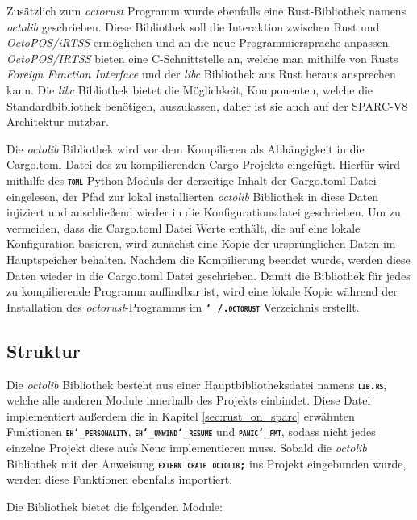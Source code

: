 Zusätzlich zum \textit{octorust} Programm wurde ebenfalls eine Rust-Bibliothek namens \textit{octolib} geschrieben. 
Diese Bibliothek soll die Interaktion zwischen Rust und \textit{OctoPOS/iRTSS} ermöglichen und an die neue 
Programmiersprache anpassen. \textit{OctoPOS/IRTSS} bieten eine C-Schnittstelle an, welche man mithilfe von Rusts
\textit{Foreign Function Interface} und der \textit{libc} Bibliothek aus Rust heraus ansprechen kann.
Die \textit{libc} Bibliothek bietet die Möglichkeit, Komponenten, welche die Standardbibliothek benötigen, 
auszulassen, daher ist sie auch auf der SPARC-V8 Architektur nutzbar.

Die \textit{octolib} Bibliothek wird vor dem Kompilieren als Abhängigkeit in die Cargo.toml Datei des
zu kompilierenden Cargo Projekts eingefügt.
Hierfür wird mithilfe des \texttt{\textsc{\textbf{toml}}} Python Moduls der derzeitige Inhalt der Cargo.toml Datei
eingelesen, der Pfad zur lokal installierten \textit{octolib} Bibliothek in diese Daten injiziert und anschließend 
wieder in die Konfigurationsdatei geschrieben.
Um zu vermeiden, dass die Cargo.toml Datei Werte enthält, die auf eine lokale Konfiguration basieren, wird zunächst
eine Kopie der ursprünglichen Daten im Hauptspeicher behalten. Nachdem die Kompilierung beendet
wurde, werden diese Daten wieder in die Cargo.toml Datei geschrieben.
Damit die Bibliothek für jedes zu kompilierende Programm auffindbar ist,
wird eine lokale Kopie während der Installation des \textit{octorust}-Programms im
\texttt{\textsc{\textbf{\char`~/.octorust}}} Verzeichnis erstellt.

\subsection{Struktur}

Die \textit{octolib} Bibliothek besteht aus einer Hauptbibliotheksdatei namens \texttt{\textsc{\textbf{lib.rs}}},
welche alle anderen Module innerhalb des Projekts einbindet. Diese
Datei implementiert außerdem die in Kapitel \ref{sec:rust_on_sparc} erwähnten Funktionen
\texttt{\textsc{\textbf{eh\char`_personality}}}, \texttt{\textsc{\textbf{eh\char`_unwind\char`_resume}}} und
\texttt{\textsc{\textbf{panic\char`_fmt}}}, sodass nicht jedes einzelne Projekt diese aufs Neue implementieren muss. 
Sobald die \textit{octolib} Bibliothek mit der Anweisung \texttt{\textsc{\textbf{extern crate octolib;}}}
ins Projekt eingebunden wurde, werden diese Funktionen ebenfalls importiert.

Die Bibliothek bietet die folgenden Module:

